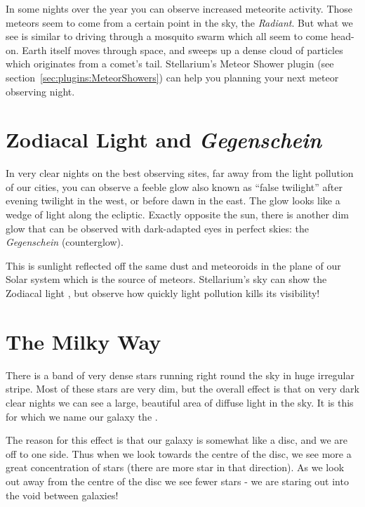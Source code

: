 In some nights over the year you can observe increased meteorite
activity. Those meteors seem to come from a certain point in the sky,
the \emph{Radiant}. But what we see is similar to driving through a
mosquito swarm which all seem to come head-on. Earth itself moves
through space, and sweeps up a dense cloud of particles which
originates from a comet's tail. Stellarium's Meteor Shower plugin (see
section~\ref{sec:plugins:MeteorShowers}) can help you planning your next
meteor observing night.

\section{Zodiacal Light and \emph{Gegenschein}}
\label{sec:Phenomena:ZodiacalLight}

In very clear nights on the best observing sites, far away from the
light pollution of our cities, you can observe a feeble glow also
known as ``false twilight'' after evening twilight in the west, or
before dawn in the east. The glow looks like a wedge of light along
the ecliptic. Exactly opposite the sun, there is another dim glow that
can be observed with dark-adapted eyes in perfect skies: the
\emph{Gegenschein} (counterglow). 

This is sunlight reflected off the same dust and meteoroids in the
plane of our Solar system which is the source of meteors. Stellarium's
sky can show the Zodiacal light \citep{Kwon:2004:ZodiacalLight}, but
observe how quickly light pollution kills its visibility!


\section{The Milky Way}
\label{sec:Phenomena:MilkyWay}

There is a band of very dense stars running right round the sky in huge
irregular stripe. Most of these stars are very dim, but the overall
effect is that on very dark clear nights we can see a large, beautiful
area of diffuse light in the sky. It is this for which we name our
galaxy the .

The reason for this effect is that our galaxy is somewhat like a disc,
and we are off to one side. Thus when we look towards the centre of the
disc, we see more a great concentration of stars (there are more star in
that direction). As we look out away from the centre of the disc we see
fewer stars - we are staring out into the void between galaxies!

